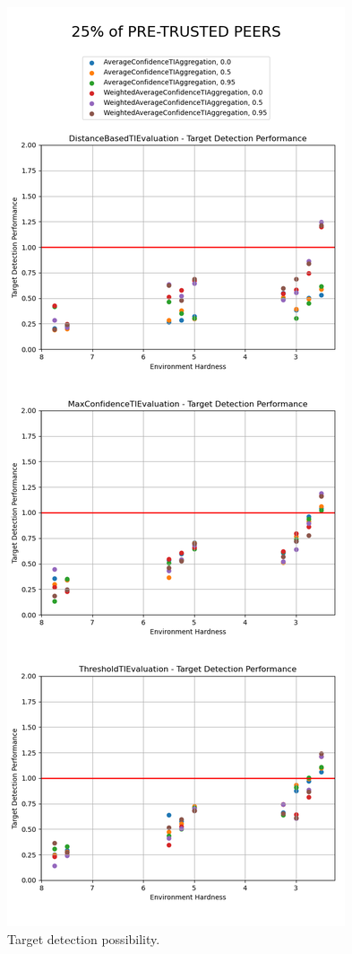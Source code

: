 \begin{figure}[hp]
    \centering
    \includegraphics[height=0.95\textheight]{assets/25_target_detection.png}
    \caption{Target detection possibility.}
    \label{fig:25-target-detection}
\end{figure}

